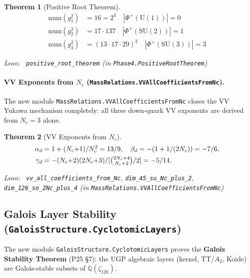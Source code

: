 \documentclass[11pt,a4paper]{article}
\newenvironment{leanref}%
  {\par\smallskip\noindent\begingroup\raggedright\textup{Lean:}~}%
  {\par\endgroup}
\newtheorem{theorem}{Theorem}[section]
\theoremstyle{definition}
\begin{document}
\begin{theorem}[Positive Root Theorem]\label{thm:posroot}
\begin{align*}
\mathrm{num}(g_1^2) &= 16 = 2^4 \quad |\Phi^+(\mathrm{U}(1))| = 0 \\
\mathrm{num}(g_2^2) &= 17 \cdot 137 \quad |\Phi^+(\mathrm{SU}(2))| = 1 \\
\mathrm{num}(g_3^2) &= (13 \cdot 17 \cdot 29)^2 \quad |\Phi^+(\mathrm{SU}(3))| = 3
\end{align*}
\begin{leanref} \lstinline|positive_root_theorem|
\textup{(in \texttt{Phase4.PositiveRootTheorem})}
\end{leanref}
\end{theorem}

\paragraph{VV Exponents from $N_c$ (\texttt{MassRelations.VVAllCoefficientsFromNc}).}
The new module \texttt{MassRelations.VVAllCoefficientsFromNc} closes the VV Yukawa
mechanism completely: all three down-quark VV exponents are derived from $N_c = 3$
alone.

\begin{theorem}[VV Exponents from $N_c$]
\begin{align*}
\alpha_d &= 1 + (N_c{+}1)/N_c^2 = 13/9, \quad \beta_d = -(1 + 1/(2N_c)) = -7/6, \\
\gamma_d &= -(N_c{+}2)(2N_c{+}3) / [\tbinom{2N_c+4}{N_c+2}/2] = -5/14.
\end{align*}
\begin{leanref} \lstinline|vv_all_coefficients_from_Nc|,
\lstinline|dim_45_su_Nc_plus_2|, \lstinline|dim_126_so_2Nc_plus_4|
\textup{(in \texttt{MassRelations.VVAllCoefficientsFromNc})}
\end{leanref}
\end{theorem}

\subsection{Galois Layer Stability (\texttt{GaloisStructure.CyclotomicLayers})}
\label{subsec:galois}

The new module \texttt{GaloisStructure.CyclotomicLayers} proves the
\textbf{Galois Stability Theorem} (P25 \S7): the UGP algebraic layers
(kernel, TT/$A_2$, Koide) are Galois-stable subsets of
$\mathbb{Q}(\zeta_{120})$.
\end{document}
